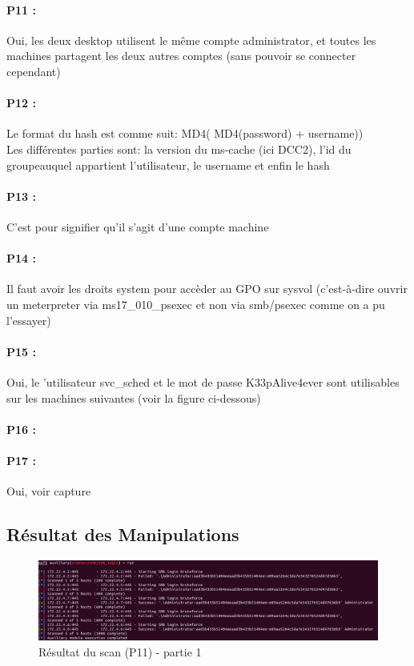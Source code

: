 \documentclass[12pt]{report} %
\begin{document}
\paragraph{P11 :} Oui, les deux desktop utilisent le même compte administrator, et toutes les machines partagent les deux autres comptes (sans pouvoir se connecter cependant)

\paragraph{P12 :} Le format du hash est comme suit:  MD4( MD4(password) + username))\\
Les différentes parties sont: la version du ms-cache (ici DCC2), l'id du groupeauquel appartient l'utilisateur,  le username et enfin le hash
\paragraph{P13 :} C'est pour signifier qu'il s'agit d'une compte machine
\paragraph{P14 :} Il faut avoir les droits system pour accèder au GPO sur sysvol (c'est-à-dire ouvrir un meterpreter via ms17\_010\_psexec et non via smb/psexec comme on a pu l'essayer)
\paragraph{P15 :} Oui, le 'utilisateur svc\_sched et le mot de passe K33pAlive4ever sont utilisables sur les machines suivantes
(voir la figure ci-dessous)
\paragraph{P16 :} 
\paragraph{P17 :} Oui, voir capture

\newpage
\subsection*{Résultat des Manipulations}

\begin{figure}[!h]
	\includegraphics[width=17cm]{P11-a.PNG}
	\caption*{Résultat du scan (P11) - partie 1}
\end{figure}
\end{document}
